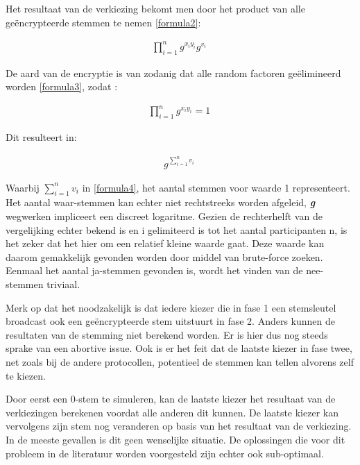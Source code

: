			Het resultaat van de verkiezing bekomt men door het product van alle geëncrypteerde stemmen te nemen \eqref{formula2}: 	
			\begin{ceqn}
				\begin{align}
				\prod_{i=1}^{n}g^{x_{i}y_{i}}g^{v_{i}} \label{formula2}\
				\end{align}
			\end{ceqn}	
			De aard van de encryptie is van zodanig dat alle random factoren geëlimineerd worden \eqref{formula3}, zodat :	
			\begin{ceqn}
				\begin{align}
				\prod_{i=1}^{n}g^{x_{i}y_{i}} = 1 \label{formula3}\
				\end{align}
			\end{ceqn}
			Dit resulteert in:
			\begin{ceqn}
				\begin{align}
				g^{\sum_{i=1}^{n}v_{i}} \label{formula4}\
				\end{align}
			\end{ceqn}
			Waarbij \textbf{\textit{$\sum_{i=1}^{n}v_{i}$}} in \eqref{formula4}, het aantal stemmen voor waarde 1 representeert. Het aantal waar-stemmen kan echter niet rechtstreeks worden afgeleid, \textbf{\textit{g}}  wegwerken impliceert een discreet logaritme. Gezien de rechterhelft van de vergelijking echter bekend is en i gelimiteerd is tot het aantal participanten n, is het zeker dat het hier om een relatief kleine waarde gaat. Deze waarde kan daarom gemakkelijk gevonden worden door middel van brute-force zoeken. Eenmaal het aantal ja-stemmen gevonden is, wordt het vinden van de nee-stemmen triviaal.
			
			Merk op dat het noodzakelijk is dat iedere kiezer die in fase 1 een stemsleutel broadcast ook een geëncrypteerde stem uitstuurt in fase 2. Anders kunnen de resultaten van de stemming niet berekend worden. Er is hier dus nog steeds sprake van een abortive issue.
			Ook is er het feit dat de laatste kiezer in fase twee, net zoals bij de andere protocollen, potentieel de stemmen kan tellen alvorens zelf te kiezen. 
			
			Door eerst een 0-stem te simuleren, kan de laatste kiezer het resultaat van de verkiezingen berekenen voordat alle anderen dit kunnen. De laatste kiezer kan vervolgens zijn stem nog veranderen op basis van het resultaat van de verkiezing. In de meeste gevallen is dit geen wenselijke situatie. De oplossingen die voor dit probleem in de literatuur worden voorgesteld zijn echter ook sub-optimaal. 
			
